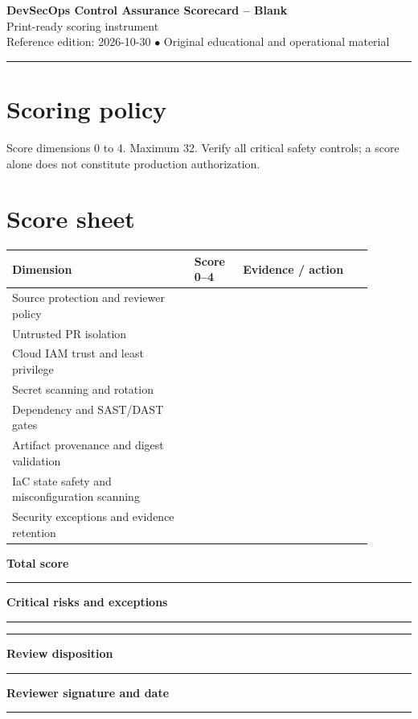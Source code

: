 \documentclass[10pt,letterpaper]{article}
\begin{document}
\begin{center}
{\LARGE\bfseries\color{cdblue}DevSecOps Control Assurance Scorecard -- Blank}\\[7pt]
{\large Print-ready scoring instrument}\\[6pt]
{\small Reference edition: 2026-10-30 $\bullet$ Original educational and operational material}
\end{center}
\noindent\color{cdblue}\rule{\linewidth}{1.2pt}\color{black}
\vspace{0.4em}
\section{Scoring policy}
Score dimensions 0 to 4. Maximum 32. Verify all critical safety controls; a score alone does not constitute production authorization.


\section{Score sheet}
\renewcommand{\arraystretch}{1.55}\begin{longtable}{|p{0.45\linewidth}|p{0.12\linewidth}|p{0.32\linewidth}|}\hline\textbf{Dimension} & \textbf{Score 0--4} & \textbf{Evidence / action}\\\hline
Source protection and reviewer policy & & \rule{0pt}{32pt} \\\hline
Untrusted PR isolation & & \rule{0pt}{32pt} \\\hline
Cloud IAM trust and least privilege & & \rule{0pt}{32pt} \\\hline
Secret scanning and rotation & & \rule{0pt}{32pt} \\\hline
Dependency and SAST/DAST gates & & \rule{0pt}{32pt} \\\hline
Artifact provenance and digest validation & & \rule{0pt}{32pt} \\\hline
IaC state safety and misconfiguration scanning & & \rule{0pt}{32pt} \\\hline
Security exceptions and evidence retention & & \rule{0pt}{32pt} \\\hline
\end{longtable}

\textbf{Total score}\par
\noindent\rule{\linewidth}{0.35pt}\par\vspace{0.7em}
\textbf{Critical risks and exceptions}\par
\noindent\rule{\linewidth}{0.35pt}\par\vspace{0.7em}
\noindent\rule{\linewidth}{0.35pt}\par\vspace{0.7em}
\textbf{Review disposition}\par
\noindent\rule{\linewidth}{0.35pt}\par\vspace{0.7em}
\textbf{Reviewer signature and date}\par
\noindent\rule{\linewidth}{0.35pt}\par\vspace{0.7em}
\end{document}

